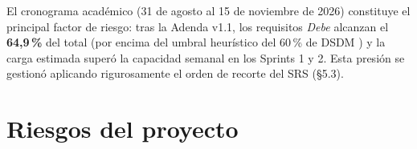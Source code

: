 \documentclass[12pt,a4paper]{article}
\begin{document}
El cronograma académico (31 de agosto al 15 de noviembre de 2026) constituye el principal factor de riesgo: tras la Adenda v1.1, los requisitos \textit{Debe} alcanzan el \textbf{64,9\,\%} del total (por encima del umbral heurístico del 60\,\% de DSDM \cite{clegg-moscow}) y la carga estimada superó la capacidad semanal en los Sprints 1 y 2. Esta presión se gestionó aplicando rigurosamente el orden de recorte del SRS (§5.3).

\section{Riesgos del proyecto}

\begingroup
{}
\scriptsize
\end{document}

